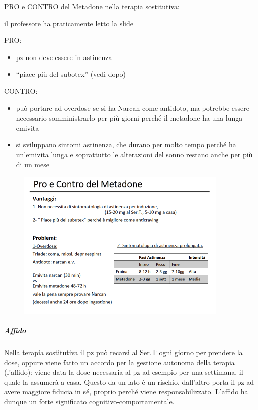 PRO e CONTRO del Metadone nella terapia sostitutiva:

il professore ha praticamente letto la slide

PRO:

\begin{itemize}
\item
  pz non deve essere in astinenza
\item
  ``piace più del subotex'' (vedi dopo)
\end{itemize}

CONTRO:

\begin{itemize}
\item
  può portare ad overdose se si ha Narcan come antidoto, ma potrebbe
  essere necessario somministrarlo per più giorni perché il metadone ha
  una lunga emivita
\item
  si sviluppano sintomi astinenza, che durano per molto tempo perché ha
  un'emivita lunga e soprattutto le alterazioni del sonno restano anche
  per più di un mese
\end{itemize}

\begin{figure}[!ht]
\centering
	\includegraphics[width=0.9\textwidth]{017/image15.png}
\end{figure}

\subparagraph{Affido}

Nella terapia sostitutiva il pz può recarsi al Ser.T ogni giorno per
prendere la dose, oppure viene fatto un accordo per la gestione autonoma
della terapia (l'affido): viene data la dose necessaria al pz ad esempio
per una settimana, il quale la assumerà a casa. Questo da un lato è un
rischio, dall'altro porta il pz ad avere maggiore fiducia in sé, proprio
perché viene responsabilizzato. L'affido ha dunque un forte significato
cognitivo-comportamentale.

